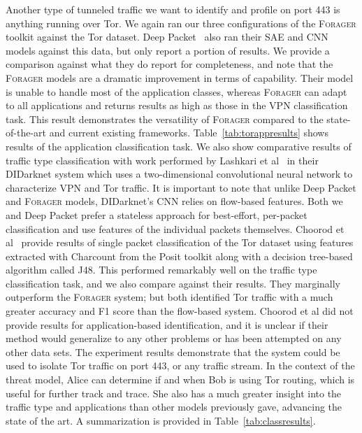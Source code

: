 Another type of tunneled traffic we want to identify and profile on port 443 is anything running over Tor. We again ran our three configurations of the \textsc{Forager} toolkit against the Tor dataset. Deep Packet~\cite{deeppacket} also ran their SAE and CNN models against this data, but only report a portion of results. We provide a comparison against what they do report for completeness, and note that the \textsc{Forager} models are a dramatic improvement in terms of capability. Their model is unable to handle most of the application classes, whereas \textsc{Forager} can adapt to all applications and returns results as high as those in the VPN classification task. This result demonstrates the versatility of \textsc{Forager} compared to the state-of-the-art and current existing frameworks. Table~\ref{tab:torappresults} shows results of the application classification task. We also show comparative results of traffic type classification with work performed by Lashkari et al~\cite{didarknet} in their DIDarknet system which uses a two-dimensional convolutional neural network to characterize VPN and Tor traffic. It is important to note that unlike Deep Packet and \textsc{Forager} models, DIDarknet's CNN relies on flow-based features. Both we and Deep Packet prefer a stateless approach for best-effort, per-packet classification and use features of the individual packets themselves. Choorod et al~\cite{choorod2022tor} provide results of single packet classification of the Tor dataset using features extracted with Charcount from the Posit toolkit along with a decision tree-based algorithm called J48. This performed remarkably well on the traffic type classification task, and we also compare against their results. They marginally outperform the \textsc{Forager}  system; but both identified Tor traffic with a much greater accuracy and F1 score than the flow-based system. Choorod et al did not provide results for application-based identification, and it is unclear if their method would generalize to any other problems or has been attempted on any other data sets. The experiment results demonstrate that the system could be used to isolate Tor traffic on port 443, or any traffic stream. In the context of the threat model, Alice can determine if and when Bob is using Tor routing, which is useful for further track and trace. She also has a much greater insight into the traffic type and applications than other models previously gave, advancing the state of the art. A summarization is provided in Table~\ref{tab:classresults}.


